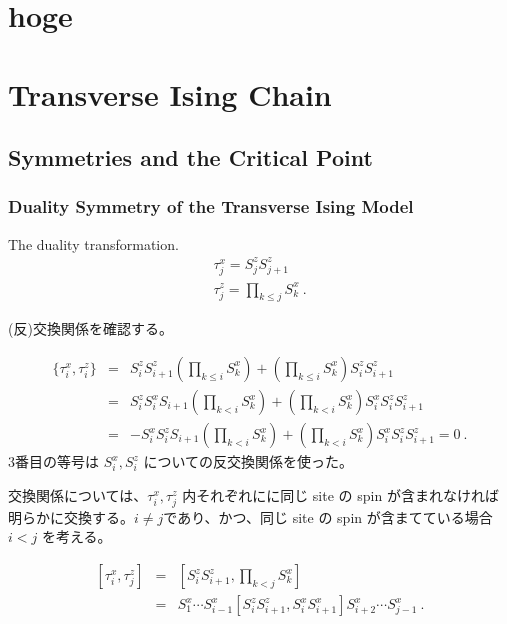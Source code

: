 \documentclass[a4j,11pt]{jreport}
\begin{document}
\chapter{hoge}

\chapter{Transverse Ising Chain}

\section{Symmetries and the Critical Point}

\subsection{Duality Symmetry of the Transverse Ising Model}

The duality transformation.
\begin{eqnarray}
\tau_{j}^x = S_{j}^z S_{j+1}^z \\
\tau_{j}^z = \prod_{k \le j} S_k^x \ .
\end{eqnarray}

(反)交換関係を確認する。

\begin{eqnarray}
 \{ \tau_{i}^x , \tau_{i}^z  \} &=& S_{i}^z S_{i+1}^z \left ( \prod_{k \le i} S_{k}^x \right ) + \left ( \prod_{k \le i}  S_{k}^x \right ) S_{i}^z S_{i+1}^z \nonumber \\
&=&
S_{i}^z S_{i}^x S_{i+1} \left ( \prod_{k < i} S_{k}^x \right ) + \left ( \prod_{k < i}  S_{k}^x \right ) S_{i}^x S_{i}^z S_{i+1}^z \nonumber \\
&=&
- S_{i}^x S_{i}^z  S_{i+1} \left ( \prod_{k < i} S_{k}^x \right ) + \left ( \prod_{k < i}  S_{k}^x \right ) S_{i}^x S_{i}^z S_{i+1}^z = 0 \ .
\end{eqnarray}
3番目の等号は $S_i^x, S_i^z$ についての反交換関係を使った。

交換関係については、$\tau_{i}^x, \tau_{j}^z$ 内それぞれにに同じ site の spin が含まれなければ明らかに交換する。$i \neq j$であり、かつ、同じ site の spin が含まてている場合 $ i < j $ を考える。

\begin{eqnarray}
 \left [
\tau_{i}^x, \tau_{j}^z
\right ]
&=&
\left [
S_{i}^z S_{i+1}^z, \prod_{k < j} S_k^x
 \right ] \nonumber \\
&=&
S_{1}^x \cdots S_{i-1}^x
 \left [
S_{i}^z S_{i+1}^z,
S_{i}^x S_{i+1}^x
 \right ]
S_{i+2}^x \cdots S_{j-1}^x \ .
\end{eqnarray}
\end{document}
